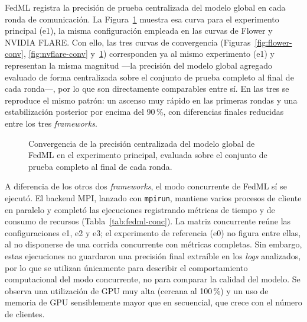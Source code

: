 FedML registra la precisión de prueba centralizada del modelo global en cada ronda de
comunicación. La Figura~\ref{fig:fedml-conv} muestra esa curva para el experimento principal
(e1), la misma configuración empleada en las curvas de Flower y NVIDIA FLARE. Con ello, las tres
curvas de convergencia (Figuras~\ref{fig:flower-conv}, \ref{fig:nvflare-conv}
y~\ref{fig:fedml-conv}) corresponden ya al mismo experimento (e1) y representan la misma
magnitud —la precisión del modelo global agregado evaluado de forma centralizada sobre el
conjunto de prueba completo al final de cada ronda—, por lo que son directamente comparables
entre sí. En las tres se reproduce el mismo patrón: un ascenso muy rápido en las primeras rondas
y una estabilización posterior por encima del 90\,\%, con diferencias finales reducidas entre los
tres \textit{frameworks}.

\begin{figure}[htbp]
  \centering
  \caption{Convergencia de la precisión centralizada del modelo global de FedML en el experimento
  principal, evaluada sobre el conjunto de prueba completo al final de cada ronda.}
  \label{fig:fedml-conv}
\end{figure}

A diferencia de los otros dos \textit{frameworks}, el modo concurrente de FedML sí se ejecutó.
El backend MPI, lanzado con \texttt{mpirun}, mantiene varios procesos de cliente en paralelo y
completó las ejecuciones registrando métricas de tiempo y de consumo de recursos
(Tabla~\ref{tab:fedml-conc}). La matriz concurrente reúne las configuraciones e1, e2 y e3; el
experimento de referencia (e0) no figura entre ellas, al no disponerse de una corrida
concurrente con métricas completas. Sin embargo, estas ejecuciones no guardaron una precisión
final extraíble en los \textit{logs} analizados, por lo que se utilizan únicamente para
describir el comportamiento computacional del modo concurrente, no para comparar la calidad del
modelo. Se observa una utilización de GPU muy alta (cercana al 100\,\%) y un uso de memoria de
GPU sensiblemente mayor que en secuencial, que crece con el número de clientes.

